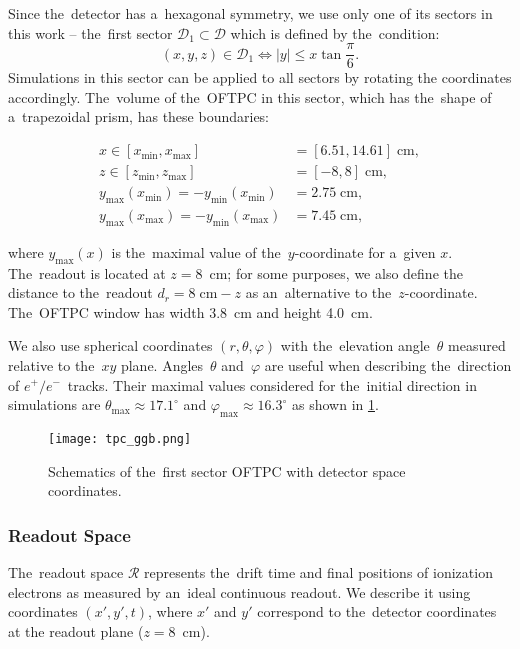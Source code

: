 				Since the~detector has a~hexagonal symmetry, we use only one of its sectors in this work -- the~first sector $\mathcal{D}_1 \subset \mathcal{D}$ which is defined by the~condition:
					\begin{equation}
						(x,y,z) \in \mathcal{D}_1 \Leftrightarrow |y| \leq x\tan \frac{\pi}{6}.
					\end{equation}
				Simulations in this sector can be applied to all sectors by rotating the coordinates accordingly. The~volume of the~\ac{OFTPC} in this sector, which has the~shape of a~trapezoidal prism, has these boundaries:
					\begin{linenomath}
						\begin{align}
							x \in [x_\text{min},x_\text{max}] &= [6.51, 14.61] \;\text{cm},\\
							z \in [z_\text{min},z_\text{max}] &= [-8,8] \;\text{cm},\\
							y_\text{max}(x_\text{min}) = -y_\text{min}(x_\text{min}) &=  2.75\;\text{cm},\\
							y_\text{max}(x_\text{max}) = -y_\text{min}(x_\text{max}) &=  7.45\;\text{cm},
						\end{align}
					\end{linenomath}
				where $y_\text{max}(x)$ is the~maximal value of the~$y$-coordinate for a~given $x$. The~readout is located at $z = 8$~cm; for some purposes, we also define the distance to the~readout $d_r = 8\;\text{cm}-z$ as an~alternative to the~$z$-coordinate. The~\ac{OFTPC} window has width 3.8~cm and height 4.0~cm.
				
				We also use spherical coordinates $(r,\theta,\varphi)$ with the~elevation angle~$\theta$ measured relative to the~$xy$ plane. Angles~$\theta$ and~$\varphi$ are useful when describing the~direction of $e^+/e^-$~tracks. Their maximal values considered for the~initial direction in simulations are $\theta_\text{max} \approx 17.1^\circ$ and $\varphi_\text{max} \approx 16.3^\circ$ as shown in \cref{fig:oftpc}.
				
				\begin{figure}
					\centering
					\texttt{[image: tpc\_ggb.png]}
					\caption{Schematics of the~first sector \ac{OFTPC} with detector space coordinates.}
					\label{fig:oftpc}
				\end{figure}
			
			\subsubsection{Readout Space}
				The~readout space $\mathcal{R}$ represents the~drift time and final positions of ionization electrons as measured by an~ideal continuous readout. We describe it using coordinates $(x',y',t)$, where $x'$ and $y'$ correspond to the~detector coordinates at the readout plane ($z = 8$~cm).
				
